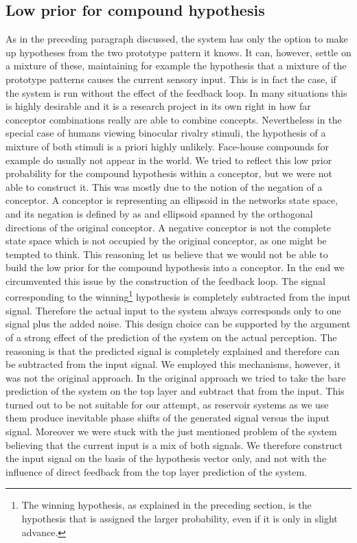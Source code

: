 \documentclass[utf8]{frontiersSCNS} %
\begin{document}
	\subsection{Low prior for compound hypothesis}
 	As in the preceding paragraph discussed, the system has only the option to make up hypotheses from the two prototype pattern it knows. It can, however, settle on a mixture of these, maintaining for example the hypothesis that a mixture of the prototype patterns causes the current sensory input. This is in fact the case, if the system is run without the effect of the feedback loop. In many situations this is highly desirable and it is a research project in its own right in how far conceptor combinations really are able to combine concepts. Nevertheless in the special case of humans viewing binocular rivalry stimuli, the hypothesis of a mixture of both stimuli is a priori highly unlikely. Face-house compounds for example do usually not appear in the world. We tried to reflect this low prior probability for the compound hypothesis within a conceptor, but we were not able to construct it. This was mostly due to the notion of the negation of a conceptor. A conceptor is representing an ellipsoid in the networks state space, and its negation is defined by  \cite{Jaeger2014}  as and ellipsoid spanned by the orthogonal directions of the original conceptor. A negative conceptor is not the complete state space which is not occupied by the original conceptor, as one might be tempted to think. This reasoning let us believe that we would not be able to build the low prior for the compound hypothesis into a conceptor. In the end we circumvented this issue by the construction of the feedback loop. The signal corresponding to the winning\footnote{The winning hypothesis, as explained in the preceding section, is the hypothesis that is assigned the larger probability, even if it is only in slight advance.  } hypothesis is completely subtracted from the input signal. Therefore the actual input to the system always corresponds only to one signal plus the added noise. This design choice can be supported by the argument of a strong effect of the prediction of the system on the actual perception. The reasoning is that the predicted signal is completely explained and therefore can be subtracted from the input signal. We employed this mechanisms, however, it was not the original approach. In the original approach we tried to take the bare prediction of the system on the top layer and subtract that from the input. This turned out to be not suitable for our attempt, as reservoir systems as we use them produce inevitable phase shifts of the generated signal versus the input signal. Moreover we were stuck with the just mentioned problem of the system believing that the current input is a mix of both signals. We therefore construct the input signal on the basis of the hypothesis vector only, and not with the influence of direct feedback from the top layer prediction of the system.  
      
\end{document}
